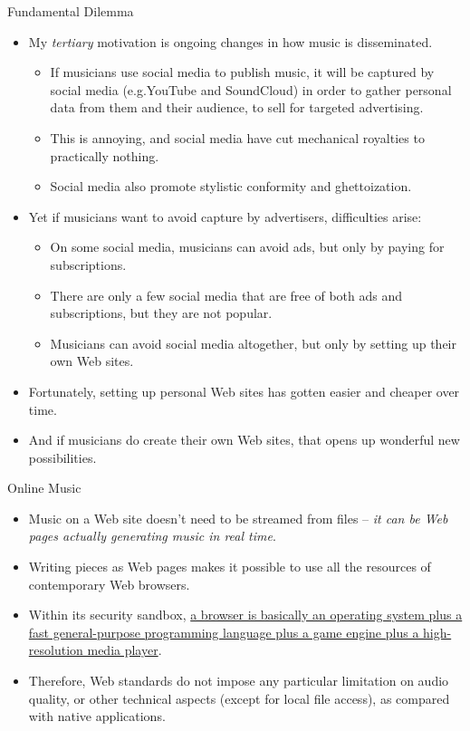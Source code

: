 \documentclass{beamer}
\begin{document}
\begin{frame}{Fundamental Dilemma}
\begin{itemize}
\item My \emph{tertiary} motivation is ongoing changes in how music is disseminated.
\begin{itemize}
\item If musicians use social media to publish music, it will be captured by social media (e.g.YouTube and SoundCloud) in order to gather personal data from them and their audience, to sell for targeted advertising.
\item This is annoying, and social media have cut mechanical royalties to practically nothing.
\item Social media also promote stylistic conformity and ghettoization.
\end{itemize}
\end{itemize}
\end{frame}

\begin{frame}{}
\begin{itemize}
\item Yet if musicians want to avoid capture by advertisers, difficulties arise:
\begin{itemize}
\item On some social media, musicians can avoid ads, but only by paying for subscriptions.
\item There are only a few social media that are free of both ads and subscriptions, but they are not popular.
\item Musicians can avoid social media altogether, but only by setting up their own Web sites.
\end{itemize}
\item Fortunately, setting up personal Web sites has gotten easier and cheaper over time.
\item And if musicians do create their own Web sites, that opens up wonderful new possibilities.
\end{itemize}
\end{frame}

\begin{frame}{Online Music}
\begin{itemize}
\item Music on a Web site doesn't need to be streamed from files -- \emph{it can be Web pages actually generating music in real time}.
\item Writing pieces as Web pages makes it possible to use all the resources of contemporary Web browsers.
\item Within its security sandbox, \href{https://html5test.co/}{a browser is basically an operating system plus a fast general-purpose programming language plus a game engine plus a high-resolution media player}.
\item Therefore, Web standards do not impose any particular limitation on audio quality, or other technical aspects (except for local file access), as compared with native applications.
\end{itemize}
\end{frame}
\end{document}
